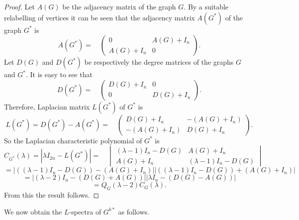 \documentclass[12pt,a4paper]{amsart}
\theoremstyle{theorem}
\theoremstyle{definition}
\numberwithin{equation}{section} \makeatletter
\begin{document}
\begin{proof}
Let $A(G)$ be the adjacency matrix of the graph $G$. By a suitable relabelling of vertices it can be seen that the adjacency matrix $A(G^*)$ of the graph $G^*$ is
 $$A(G^*)=\quad
\begin{pmatrix}
0 & A(G)+I_n \\
A(G)+I_n & 0
\end{pmatrix}.$$
Let $D(G)$ and $D(G^*)$ be respectively the degree matrices of the graphs $G$ and $G^*$. It is easy to see that
$$D(G^*)=\quad
\begin{pmatrix}
D(G)+I_n & 0 \\
0 & D(G)+I_n
\end{pmatrix}.$$
Therefore, Laplacian matrix $L(G^*)$ of $G^*$ is $$L(G^*)=D(G^*)-A(G^*)=\quad
\begin{pmatrix}
D(G)+I_n & -(A(G)+I_n) \\
-(A(G)+I_n) & D(G)+I_n
\end{pmatrix}.$$
So the Laplacian characteristic polynomial of $G^*$ is $$C_{G^*}(\lambda)= |\lambda I_{2n}-L(G^*)|=
\quad
\begin{vmatrix}
(\lambda-1)I_n-D(G) & A(G)+I_n \\
A(G)+I_n & (\lambda-1)I_n-D(G)
\end{vmatrix}$$
$$=\left |((\lambda-1)I_n-D(G))-(A(G)+I_n)\right |\left |((\lambda-1)I_n-D(G))+(A(G)+I_n) \right|$$
$$=\left |(\lambda-2)I_n-(D(G)+A(G)) \right| \left|\lambda I_n-(D(G)-A(G)) \right|$$
$$= Q_G(\lambda-2) C_G(\lambda).$$
\indent From this the result follows.
\end{proof}

\indent We now obtain the $L$-spectra of $G^{k*}$ as follows.
\end{document}
